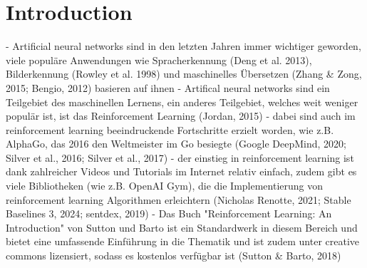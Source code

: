 \chapter{Introduction}

- Artificial neural networks sind in den letzten Jahren immer wichtiger geworden, viele populäre Anwendungen wie Spracherkennung (Deng et al. 2013), Bilderkennung (Rowley et al. 1998) und maschinelles Übersetzen (Zhang & Zong, 2015; Bengio, 2012) basieren auf ihnen
- Artifical neural networks sind ein Teilgebiet des maschinellen Lernens, ein anderes Teilgebiet, welches weit weniger populär ist, ist das Reinforcement Learning (Jordan, 2015)
- dabei sind auch im reinforcement learning beeindruckende Fortschritte erzielt worden, wie z.B. AlphaGo, das 2016 den Weltmeister im Go besiegte (Google DeepMind, 2020; Silver et al., 2016; Silver et al., 2017)
- der einstieg in reinforcement learning ist dank zahlreicher Videos und Tutorials im Internet relativ einfach, zudem gibt es viele Bibliotheken (wie z.B. OpenAI Gym), die die Implementierung von reinforcement learning Algorithmen erleichtern (Nicholas Renotte, 2021; Stable Baselines 3, 2024; sentdex, 2019)
- Das Buch "Reinforcement Learning: An Introduction" von Sutton und Barto ist ein Standardwerk in diesem Bereich und bietet eine umfassende Einführung in die Thematik und ist zudem unter creative commons lizensiert, sodass es kostenlos verfügbar ist (Sutton & Barto, 2018)

